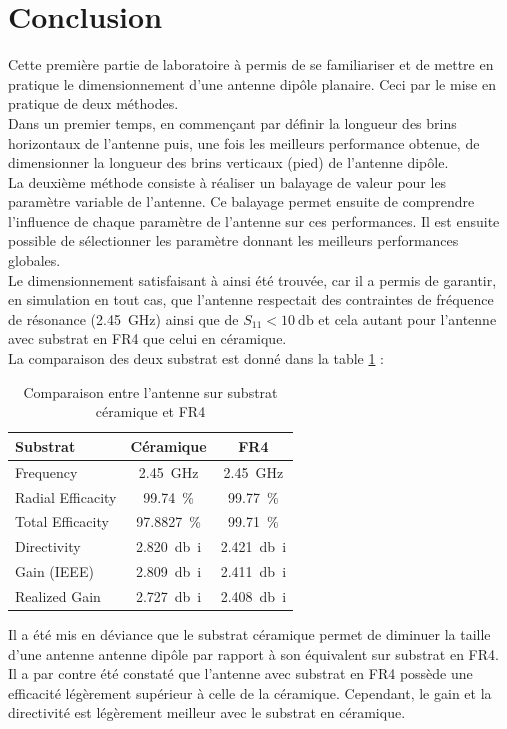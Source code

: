 \documentclass[Deriaz_Traiber_Labo02]{subfiles}
\begin{document}
\pagebreak

\section{Conclusion}

Cette première partie de laboratoire à permis de se familiariser et de mettre en pratique le dimensionnement d'une antenne dipôle planaire. Ceci par le mise en pratique de deux méthodes.\\

Dans un premier temps, en commençant par définir la longueur des brins horizontaux de l'antenne puis, une fois les meilleurs performance obtenue, de dimensionner la longueur des brins verticaux (pied) de l'antenne dipôle.\\

La deuxième méthode consiste à réaliser un balayage de valeur pour les paramètre variable de l'antenne. Ce balayage permet ensuite de comprendre l'influence de chaque paramètre de l'antenne sur ces performances. Il est ensuite possible de sélectionner les paramètre donnant les meilleurs performances globales.\\

Le dimensionnement satisfaisant à ainsi été trouvée, car il a permis de garantir, en simulation en tout cas, que l'antenne respectait des contraintes de fréquence de résonance (\SI{2.45}{\giga\hertz}) ainsi que de $S_{11}<\SI{10}{\decibel}$ et cela autant pour l'antenne avec substrat en FR4 que celui en céramique.\\

La comparaison des deux substrat est donné dans la table \ref{tab:comp-substrat} :
\begin{table}[H]
\centering
\begin{tabular}{l c c}\hline
Substrat				& Céramique					&	FR4		\\\hline
Frequency			& \SI{2.45}{\giga\hertz}		&	\SI{2.45}{\giga\hertz}\\
Radial Efficacity	& \SI{99.74}{\percent} 		&	\SI{99.77}{\percent}	\\
Total Efficacity		& \SI{97.8827}{\percent}		& 	\SI{99.71}{\percent}	\\
Directivity			& \SI{2.820}{\decibel i}		&	\SI{2.421}{\decibel i}\\
Gain	 (IEEE)			& \SI{2.809}{\decibel i}		&	\SI{2.411}{\decibel i}\\
Realized Gain		& \SI{2.727}{\decibel i}		&	\SI{2.408}{\decibel i}\\\hline
\end{tabular}
\caption{Comparaison entre l'antenne sur substrat céramique et FR4}
\label{tab:comp-substrat}
\end{table}

Il a été mis en déviance que le substrat céramique permet de diminuer la taille d'une antenne antenne dipôle par rapport à son équivalent sur substrat en FR4. Il a par contre été constaté que l'antenne avec substrat en FR4 possède une efficacité légèrement supérieur à celle de la  céramique. Cependant, le gain et la directivité est légèrement meilleur avec le substrat en céramique.
\end{document}
